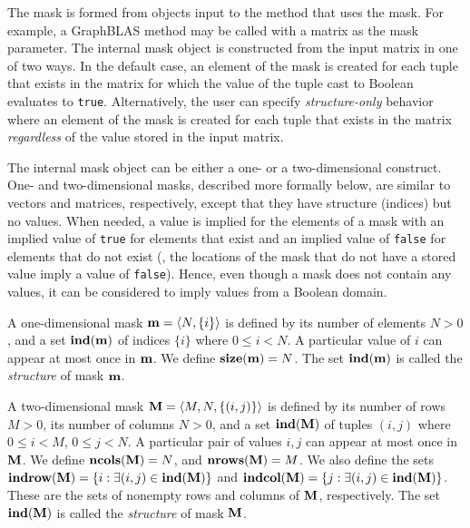 The mask is formed from objects input to the method that uses 
the mask.  For example, a GraphBLAS method may be called with a matrix as the mask
parameter.   The internal mask object is constructed from the input matrix in one
of two ways.  In the default case, an element of the mask is created for each 
tuple that exists in the matrix for which the value of the tuple cast to Boolean 
evaluates to {\tt true}.  Alternatively, the user can specify {\em structure-only} behavior where
an element of the mask is created for each tuple that exists in the matrix 
{\em regardless} of the value stored in the input matrix.

The internal mask object can be either a one- or a two-dimensional construct.  One- and
two-dimensional masks, described more formally below, are similar to
vectors and matrices, respectively, except that they have structure
(indices) but no values.  When needed, a value is implied for the elements of a 
mask with an implied value of {\tt true} for elements that exist 
and an implied value of {\tt false} for elements that do not exist (\ie,
the locations of the mask that do not have a stored value imply a value of {\tt false}).
Hence, even though a mask does not contain any values, it can be 
considered to imply values from a Boolean domain.

A one-dimensional mask ${\bf m} = \langle N, \{ i \} \rangle$ is
defined by its number of elements $N>0$, and a set $\mathbf{ind}({\bf m})$
of indices $\{ i \}$ where $0 \leq i < N$.  A particular value of $i$ can
appear at most once in ${\bf m}$. We define $\mathbf{size}({\bf m})
= N$. The set $\mathbf{ind}({\bf m})$ is called the \emph{structure} of mask ${\bf m}$.

A two-dimensional mask ${\bf M} = \langle M, N, \{ (i,j) \}
\rangle$ is defined by its number of rows $M>0$, its number of
columns $N>0$, and a set $\mathbf{ind}({\bf M})$ of tuples $(i,j)$
where $0 \leq i < M$, $0 \leq j < N$.   A particular pair of values
$i,j$ can appear at most once in ${\bf M}$.  We define
$\mathbf{ncols}({\bf M}) = N$, and $\mathbf{nrows}({\bf M}) = M$.
We also define the sets ${\bf indrow({\bf M})} = \{ i : \exists
(i,j) \in \mathbf{ind}({\bf M}) \}$ and ${\bf indcol({\bf M})}
= \{ j : \exists (i,j) \in \mathbf{ind}({\bf M}) \}$.  These are
the sets of nonempty rows and columns of ${\bf M}$, respectively.
The set $\mathbf{ind}({\bf M})$ is called the \emph{structure} of mask ${\bf M}$.

